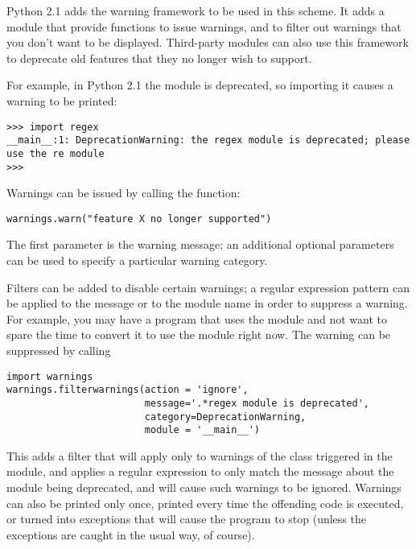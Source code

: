 \documentclass{howto}
\begin{document}
Python 2.1 adds the warning framework to be used in this scheme.  It
adds a  module that provide functions to issue
warnings, and to filter out warnings that you don't want to be
displayed. Third-party modules can also use this framework to
deprecate old features that they no longer wish to support.

For example, in Python 2.1 the  module is deprecated,
so importing it causes a warning to be printed:

\begin{verbatim}
>>> import regex
__main__:1: DeprecationWarning: the regex module is deprecated; please use the re module
>>> 
\end{verbatim}

Warnings can be issued by calling the  function:

\begin{verbatim}
warnings.warn("feature X no longer supported")              
\end{verbatim}

The first parameter is the warning message; an additional optional
parameters can be used to specify a particular warning category.

Filters can be added to disable certain warnings; a regular expression
pattern can be applied to the message or to the module name in order
to suppress a warning.  For example, you may have a program that uses
the  module and not want to spare the time to convert it
to use the  module right now.  The warning can be
suppressed by calling

\begin{verbatim}
import warnings
warnings.filterwarnings(action = 'ignore',
                        message='.*regex module is deprecated',
                        category=DeprecationWarning,
                        module = '__main__')
\end{verbatim}

This adds a filter that will apply only to warnings of the class
 triggered in the  module, and applies a regular expression to only match the message about the  module being deprecated, and will cause such warnings to be ignored.  Warnings can also be printed only once, printed every time the offending code is executed, or turned into exceptions that will cause the program to stop (unless the exceptions are caught in the usual way, of course). 
\end{document}
